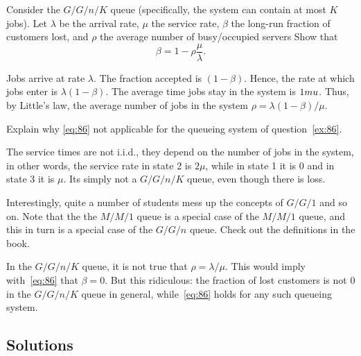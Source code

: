 \begin{exercise}[201807]{1}
  Consider the $G/G/n/K$ queue (specifically, the system can contain at most $K$ jobs).
  Let $\lambda$ be the arrival rate, $\mu$ the service rate, $\beta$ the long-run fraction of customers lost, and $\rho$ the average number of busy/occupied servers Show that
  \begin{equation}\label{eq:86}
    \beta = 1 - \rho\frac{\mu}{\lambda}.
  \end{equation}
\begin{solution}
    Jobs arrive at rate $\lambda$.
    The fraction accepted is $(1-\beta)$.
    Hence, the rate at which jobs enter is $\lambda(1-\beta)$. The average time jobs stay in the system is $1\\mu$. Thus, by Little's law, the average number of jobs in the system $\rho=\lambda(1-\beta)/\mu$. 
\end{solution}
\end{exercise}


\begin{exercise}[201807]{1}
  Explain why \cref{eq:86} not applicable for the queueing system of question~\cref{ex:86}.
\begin{solution}
    The service times are not i.i.d., they depend on the number of jobs in the system, in other words, the service rate in state 2 is $2\mu$, while in state 1 it is 0 and in state 3 it is $\mu$. Its simply not a $G/G/n/K$ queue, even though there is loss. 


Interestingly, quite a number of students mess up the concepts of $G/G/1$ and so on. Note that the the $M/M/1$ queue is a special case of the $M/M/1$ queue, and this in turn is a special case of the $G/G/n$ queue. Check out the definitions in the book.

In the $G/G/n/K$ queue, it is not true that $\rho=\lambda/\mu$. This would imply with~\cref{eq:86} that $\beta=0$. But this ridiculous: the fraction of lost customers is not 0 in the $G/G/n/K$ queue in general, while~\cref{eq:86} holds for any such queueing system. 
\end{solution}
\end{exercise}





\subsection*{Solutions}




